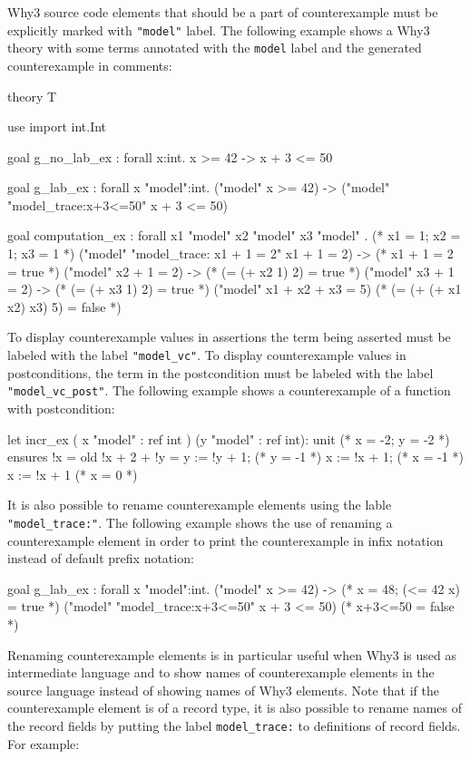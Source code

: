 Why3 source code elements that should be a part of counterexample must be
explicitly marked with \texttt{"model"} label. The following example shows a
Why3 theory with some terms annotated with the \texttt{model} label and the
generated counterexample in comments:

\begin{whycode}
theory T

  use import int.Int

  goal g_no_lab_ex : forall x:int. x >= 42 -> x + 3 <= 50

  goal g_lab_ex : forall x "model":int. ("model" x >= 42) ->
    ("model" "model_trace:x+3<=50" x + 3 <= 50)

  goal computation_ex : forall x1 "model" x2 "model" x3 "model" .
  (* x1 = 1; x2 = 1; x3 = 1 *)
  ("model" "model_trace: x1 + 1 = 2" x1 + 1 = 2) ->
  (*  x1 + 1 = 2 = true *)
  ("model" x2 + 1 = 2) ->
  (* (= (+ x2 1) 2) = true *)
  ("model" x3 + 1 = 2) ->
  (* (= (+ x3 1) 2) = true *)
  ("model" x1 + x2 + x3  = 5)
  (* (= (+ (+ x1 x2) x3) 5) = false *)
\end{whycode}

To display counterexample values in assertions the term being asserted must be
labeled with the label \texttt{"model\_vc"}. To display counterexample values
in postconditions, the term in the postcondition must be labeled with the
label \texttt{"model\_vc\_post"}.
The following example shows a counterexample of a function with postcondition:

\begin{whycode}
  let incr_ex ( x "model" : ref int ) (y "model" : ref int): unit
  (* x = -2; y = -2 *)
  ensures { !x = old !x + 2 + !y }
  =
  y := !y + 1;
  (* y = -1 *)
  x := !x + 1;
  (* x = -1 *)
  x := !x + 1
  (* x = 0 *)
\end{whycode}

It is also possible to rename counterexample elements using the lable
\texttt{"model\_trace:"}. The following example shows the use of renaming a
counterexample element in order to print the counterexample in infix notation
instead of default prefix notation:

\begin{whycode}
  goal g_lab_ex : forall x "model":int. ("model" x >= 42) ->
  (* x = 48; (<= 42 x) = true *)
    ("model" "model_trace:x+3<=50" x + 3 <= 50)
    (* x+3<=50 = false *)
\end{whycode}

Renaming counterexample elements is in particular useful when Why3 is used as
intermediate language and to show names of counterexample elements in the
source language instead of showing names of Why3 elements.
Note that if the counterexample element is of a record type, it is also
possible to rename names of the record fields by putting the label
\texttt{model\_trace:} to definitions of record fields. For example:

